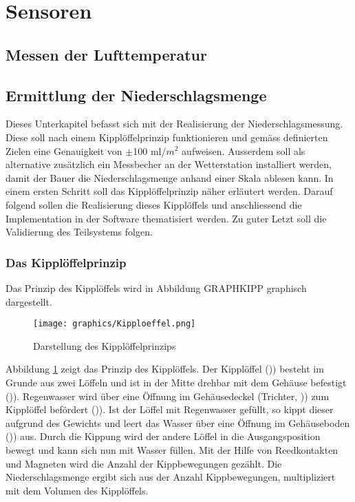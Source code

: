 \section{Sensoren}


\subsection{Messen der Lufttemperatur}
\subsection{Ermittlung der Niederschlagsmenge}
Dieses Unterkapitel befasst sich mit der Realisierung der Niederschlagsmessung. Diese soll nach einem Kipplöffelprinzip funktionieren und gemäss definierten Zielen eine Genauigkeit von $\pm$100 ml/$m^2$ aufweisen. Ausserdem soll als alternative zusätzlich ein Messbecher an der Wetterstation installiert werden, damit der Bauer die Niederschlagsmenge anhand einer Skala ablesen kann. In einem ersten Schritt soll das Kipplöffelprinzip näher erläutert werden. Darauf folgend sollen die Realisierung dieses Kipplöffels und anschliessend die Implementation in der Software thematisiert werden. Zu guter Letzt soll die Validierung des Teilsystems folgen.
\subsubsection*{Das Kipplöffelprinzip}
Das Prinzip des Kipplöffels wird in Abbildung GRAPHKIPP graphisch dargestellt.

\begin{figure}[h]
\centering
\texttt{[image: graphics/Kipploeffel.png]}
\caption{Darstellung des Kipplöffelprinzips}
\label{fig:Kipp}
\end{figure}

Abbildung \ref{fig:Kipp} zeigt das Prinzip des Kipplöffels. Der Kipplöffel ()\grqq) besteht im Grunde aus zwei Löffeln und ist in der Mitte drehbar mit dem Gehäuse befestigt ()\grqq). Regenwasser wird über eine Öffnung im Gehäusedeckel (Trichter, )\grqq) zum Kipplöffel befördert ()\grqq). Ist der Löffel mit Regenwasser gefüllt, so kippt dieser aufgrund des Gewichts und leert das Wasser über eine Öffnung im Gehäuseboden ()\grqq) aus. Durch die Kippung wird der andere Löffel in die Ausgangsposition bewegt und kann sich nun mit Wasser füllen. Mit der Hilfe von Reedkontakten und Magneten wird die Anzahl der Kippbewegungen gezählt. Die Niederschlagsmenge ergibt sich aus der Anzahl Kippbewegungen, multipliziert mit dem Volumen des Kipplöffels.
